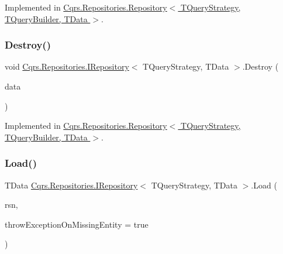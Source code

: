 Implemented in \hyperlink{classCqrs_1_1Repositories_1_1Repository_a6b6b50d476a351fc7fbd194cb8fa44d0}{Cqrs.\+Repositories.\+Repository$<$ T\+Query\+Strategy, T\+Query\+Builder, T\+Data $>$}.

\mbox{\label{interfaceCqrs_1_1Repositories_1_1IRepository_a3a7a60be19498813b3822558b88fad66}} 
\subsubsection{\texorpdfstring{Destroy()}{Destroy()}}
{\footnotesize\ttfamily void \hyperlink{interfaceCqrs_1_1Repositories_1_1IRepository}{Cqrs.\+Repositories.\+I\+Repository}$<$ T\+Query\+Strategy, T\+Data $>$.Destroy (\begin{DoxyParamCaption}\item[{T\+Data}]{data }\end{DoxyParamCaption})}



Implemented in \hyperlink{classCqrs_1_1Repositories_1_1Repository_a6ed69cb5542164d9de81b0fa8a549d3e}{Cqrs.\+Repositories.\+Repository$<$ T\+Query\+Strategy, T\+Query\+Builder, T\+Data $>$}.

\mbox{\label{interfaceCqrs_1_1Repositories_1_1IRepository_ae545451c48d1e2b5693db73e169e100d}} 
\subsubsection{\texorpdfstring{Load()}{Load()}}
{\footnotesize\ttfamily T\+Data \hyperlink{interfaceCqrs_1_1Repositories_1_1IRepository}{Cqrs.\+Repositories.\+I\+Repository}$<$ T\+Query\+Strategy, T\+Data $>$.Load (\begin{DoxyParamCaption}\item[{Guid}]{rsn,  }\item[{bool}]{throw\+Exception\+On\+Missing\+Entity = {\ttfamily true} }\end{DoxyParamCaption})}



